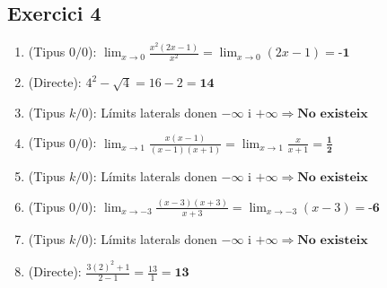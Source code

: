 \documentclass[12pt,a4paper]{article}
\begin{document}
\subsection*{Exercici 4}
\begin{enumerate}[label=\textbf{\arabic*.}]
    \item (Tipus $0/0$): $\lim_{x \to 0} \frac{x^2(2x-1)}{x^2} = \lim_{x \to 0} (2x-1) = \textbf{-1}$
    \item (Directe): $4^2 - \sqrt{4} = 16 - 2 = \textbf{14}$
    \item (Tipus $k/0$): Límits laterals donen $-\infty$ i $+\infty \Rightarrow \textbf{No existeix}$
    \item (Tipus $0/0$): $\lim_{x \to 1} \frac{x(x-1)}{(x-1)(x+1)} = \lim_{x \to 1} \frac{x}{x+1} = \mathbf{\frac{1}{2}}$
    \item (Tipus $k/0$): Límits laterals donen $-\infty$ i $+\infty \Rightarrow \textbf{No existeix}$
    \item (Tipus $0/0$): $\lim_{x \to -3} \frac{(x-3)(x+3)}{x+3} = \lim_{x \to -3} (x-3) = \textbf{-6}$
    \item (Tipus $k/0$): Límits laterals donen $-\infty$ i $+\infty \Rightarrow \textbf{No existeix}$
    \item (Directe): $\frac{3(2)^2 + 1}{2-1} = \frac{13}{1} = \textbf{13}$
\end{enumerate}
\end{document}
